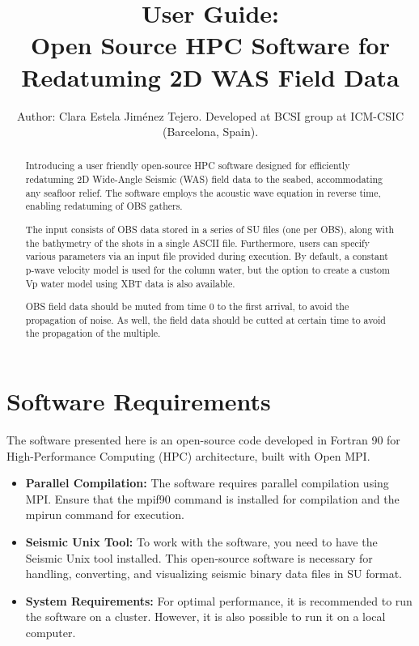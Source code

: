 \documentclass[11pt, oneside]{article}   	%
\title{User Guide: \\Open Source HPC Software for Redatuming 2D WAS Field Data}
\author{Author: Clara Estela Jim\'enez Tejero. Developed at BCSI group at ICM-CSIC (Barcelona, Spain).}
\date{}							%
\begin{document}
\maketitle
\begin{abstract}

Introducing a user friendly open-source HPC software designed for efficiently redatuming 2D Wide-Angle Seismic (WAS) field data to the seabed, accommodating any seafloor relief. The software employs the acoustic wave equation in reverse time, enabling redatuming of OBS gathers.

The input consists of OBS data stored in a series of SU files (one per OBS), along with the bathymetry of the shots in a single ASCII file. Furthermore, users can specify various parameters via an input file provided during execution. By default, a constant p-wave velocity model is used for the column water, but the option to create a custom Vp water model using XBT data is also available.

OBS field data should be muted from time 0 to the first arrival, to avoid the propagation of noise. As well, the field data should be cutted at certain time to avoid the propagation of the multiple.

\end{abstract}
\section{Software Requirements}\label{sec1}

The software presented here is an open-source code developed in Fortran 90 for High-Performance Computing (HPC) architecture, built with Open MPI.

\begin{itemize}
\item \textbf{Parallel Compilation:} The software requires parallel compilation using MPI. Ensure that the mpif90 command is installed for compilation and the mpirun command for execution.

\item \textbf{Seismic Unix Tool:} To work with the software, you need to have the Seismic Unix tool \cite{SU} installed. This open-source software is necessary for handling, converting, and visualizing seismic binary data files in SU format.

\item \textbf{System Requirements:} For optimal performance, it is recommended to run the software on a cluster. However, it is also possible to run it on a local computer.

\end{itemize}
\end{document}
